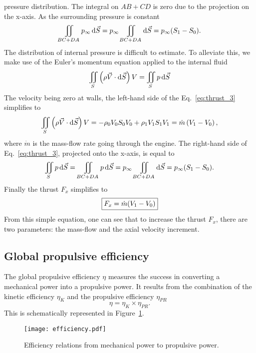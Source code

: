 pressure distribution. The integral on
$AB + CD$ is zero due to the projection on
the x-axis.
As the surrounding pressure is constant
\begin{equation}
	\iint_{BC + DA} p_{\infty} \diff \vec{S} =
	p_{\infty} \iint_{BC + DA} \diff \vec{S} =
	p_{\infty} (S_{1} - S_{0}).
	\label{eq:thrust_2}
\end{equation}
The distribution of internal pressure is
difficult to estimate. To alleviate this, 
we make use of the Euler’s momentum 
equation applied to the internal fluid
\begin{equation}
	\iint_{S} \left(\rho \vec{V} \cdot \diff \vec{S} \right) V = 
	\iint_{S} p \diff \vec{S}
	\label{eq:thrust_3}
\end{equation}
The velocity being zero at walls, 
the left-hand side of the Eq.~\eqref{eq:thrust_3}
simplifies to
\begin{equation}
	\iint_{S} \left(\rho \vec{V} \cdot \mathop{}\!\mathrm{d} \vec{S} \right) V =
	- \rho_0 V_0 S_0 V_0 +  \rho_1 V_1 S_1 V_1 = 
	\dot{m} \left( V_{1} - V_{0} \right),
\end{equation}
where $\dot{m}$ is the mass-flow rate going through the engine.
The right-hand side of Eq.~\eqref{eq:thrust_3}, projected onto
the x-axis, is equal to 
\begin{equation}
	\iint_{S} p \mathop{}\!\mathrm{d} \vec{S} = 
	\iint_{BC + DA} p \mathop{}\!\mathrm{d} \vec{S} = 
	p_{\infty} \iint_{BC + DA} \mathop{}\!\mathrm{d} \vec{S} =
	p_{\infty} (S_{1} - S_{0}).
\end{equation}
Finally the thrust $F_x$ simplifies to
\begin{equation}
	\fbox{$
	F_x = \dot{m} (V_{1} - V_{0})
	$}
	\label{eq:cror_thrust}
\end{equation}
From this simple equation,
one can see that to increase the thrust $F_x$, there are two parameters:
the mass-flow and the axial velocity increment.

\subsection{Global propulsive efficiency}
\label{sub:cror_efficiency}

The global propulsive efficiency $\eta$ measures the 
success in converting a mechanical power into a
propulsive power. It results from the combination
of the kinetic efficiency $\eta_{K}$ and the propulsive efficiency
$\eta_{PR}$
\begin{equation}
	\eta = \eta_{K} \times \eta_{PR}.
\end{equation}
This is schematically represented in Figure~\ref{fig:cror_efficiency}.
\begin{figure}[htp]
  \centering
  \texttt{[image: efficiency.pdf]}
  \caption{Efficiency relations from mechanical power to propulsive power.}
  \label{fig:cror_efficiency}
\end{figure}

